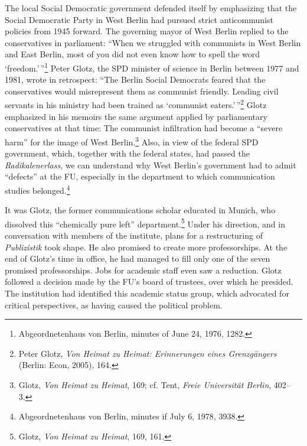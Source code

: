 \documentclass{tufte-handout}
\begin{document}
The local Social Democratic government defended itself by emphasizing
that the Social Democratic Party in West Berlin had pursued strict
anticommunist policies from 1945 forward. The governing mayor of West
Berlin replied to the conservatives in parliament: ``When we struggled
with communists in West Berlin and East Berlin, most of you did not even
know how to spell the word `freedom.'\,''\footnote{Abgeordnetenhaus von
  Berlin, minutes of June 24, 1976, 1282.} Peter Glotz, the SPD minister
of science in Berlin between 1977 and 1981, wrote in retrospect: ``The
Berlin Social Democrats feared that the conservatives would misrepresent
them as communist friendly. Leading civil servants in his ministry had
been trained as `communist eaters.'\,''\footnote{Peter Glotz, \emph{Von
  Heimat zu Heimat: Erinnerungen eines Grenzgängers} (Berlin: Econ,
  2005), 164.} Glotz emphasized in his memoirs the same argument applied
by parliamentary conservatives at that time: The communist infiltration
had become a ``severe harm'' for the image of West Berlin.\footnote{Glotz,
  \emph{Von Heimat zu Heimat}, 169; cf. Tent, \emph{Freie Universität
  Berlin}, 402--3.} Also, in view of the federal SPD government, which,
together with the federal states, had passed the \emph{Radikalenerlass},
we can understand why West Berlin's government had to admit ``defects''
at the FU, especially in the department to which communication studies
belonged.\footnote{Abgeordnetenhaus von Berlin, minutes if July 6, 1978,
  3938.}
  
\enlargethispage{-\baselineskip}

It was Glotz, the former communications scholar educated in Munich, who
dissolved this ``chemically pure left'' department.\footnote{Glotz,
  \emph{Von Heimat zu Heimat}, 169, 161.} Under his direction, and in
conversation with members of the institute, plans for a restructuring of
\emph{Publizistik} took shape. He also promised to create more
professorships. At the end of Glotz's time in office, he had managed to
fill only one of the seven promised professorships. Jobs for academic
staff even saw a reduction. Glotz followed a decision made by the FU's
board of trustees, over which he presided. The institution had
identified this academic status group, which advocated for critical
perspectives, as having caused the political problem.
\end{document}
